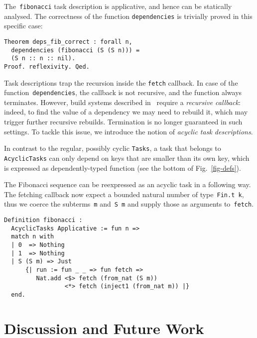\documentclass[sigplan,review]{acmart}\settopmatter{printfolios=true,printccs=false,printacmref=false}
\newcommand{\hs}{\texttt}
\newcommand{\coq}{\texttt}
\begin{document}
The~\hs{fibonacci} task description is applicative, and hence can be statically
analysed. The correctness of the function \hs{dependencies} is trivially proved
in this specific case:

\vspace{-1mm}
\begin{verbatim}
Theorem deps_fib_correct : forall n,
  dependencies (fibonacci (S (S n))) =
  (S n :: n :: nil).
Proof. reflexivity. Qed.
\end{verbatim}
\vspace{-1mm}

Task descriptions trap the recursion inside the \hs{fetch} callback. In case of
the function~\hs{dependencies}, the callback is not recursive, and the function
always terminates. However, build systems described in~\cite{Mokhov2018icfp}
require a \emph{recursive callback}: indeed, to find the value of a dependency we
may need to rebuild it, which may trigger further recursive rebuilds.
Termination is no longer guaranteed in such settings. To tackle this issue, we
introduce the notion of \emph{acyclic task descriptions}.

In contrast to the regular, possibly cyclic \hs{Tasks}, a task that belongs
to \hs{AcyclicTasks} can only depend on keys that are smaller than its own key,
which is expressed as dependently-typed function (see the bottom of
Fig.~\ref{fig-defs}).

The Fibonacci sequence can be reexpressed as an acyclic task in a following way.
The fetching callback now expect a bounded natural number of type~\hs{Fin.t k},
thus we coerce the subterms~\coq{m} and~\coq{S m} and supply those as arguments
to~\hs{fetch}.

\vspace{-1mm}
\begin{verbatim}
Definition fibonacci :
  AcyclicTasks Applicative := fun n =>
  match n with
  | 0  => Nothing
  | 1  => Nothing
  | S (S m) => Just
      {| run := fun _ _ => fun fetch =>
         Nat.add <$> fetch (from_nat (S m))
                 <*> fetch (inject1 (from_nat m)) |}
  end.
\end{verbatim}
\vspace{-1mm}

\vspace{-3mm}
\section{Discussion and Future Work}\label{sec-discussion}
\vspace{-1mm}
\end{document}
